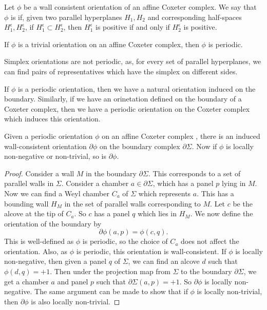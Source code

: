 \documentclass[11pt]{article}
\begin{document}
\begin{definition}
    Let $\phi$ be a wall consistent orientation of an affine Coxeter complex. We say that $\phi$ is  if, given two parallel hyperplanes $H_1,H_2$ and corresponding half-spaces $H_1^{\epsilon},H_2^{\epsilon}$, if $H_1^{\epsilon}\subset H_2^{\epsilon}$, then $H_1^{\epsilon}$ is positive if and only if $H_2^{\epsilon}$ is positive. 
\end{definition}

\begin{example}
    If $\phi$ is a trivial orientation on an affine Coxeter complex, then $\phi$ is periodic. 
\end{example}

\begin{example}
    Simplex orientations are not periodic, as, for every set of parallel hyperplanes, we can find pairs of representatives which have the simplex on different sides.
\end{example}

If $\phi$ is a periodic orientation, then we have a natural orientation induced on the boundary. Similarly, if we have an orinetation defined on the boundary of a Coxeter complex, then we have a periodic orientation on the Coxeter complex which induces this orientation. 

\begin{lemma}\cite[p.125]{SHA}
    Given a periodic orientation $\phi$ on an affine Coxeter complex \sg, there is an induced wall-consistent orientation $\partial\phi$ on the boundary complex $\partial\Sigma$. Now if $\phi$ is locally non-negative or non-trivial, so is $\partial\phi$. 
\end{lemma}

\begin{proof}
    Consider a wall $M$ in the boundary $\partial\Sigma$. This corresponds to a set of parallel walls in $\Sigma$. Consider a chamber $a\in \partial\Sigma$, which has a panel $p$ lying in $M$. Now we can find a Weyl chamber $C_a$ of $\Sigma$ which represents $a$. This has a bounding wall $H_M$ in the set of parallel walls corresponding to $M$. Let $c$ be the alcove at the tip of $C_a$. So $c$ has a panel $q$ which lies in $H_M$. We now define the orientation of the boundary by 
    \[\partial \phi (a,p)= \phi (c,q).\]
    This is well-defined as $\phi$ is periodic, so the choice of $C_a$ does not affect the orientation. Also, as $\phi$ is periodic, this orientation is wall-consistent. 
    If $\phi$ is locally non-negative, then given a panel $q$ of $\Sigma$, we can find an alcove $d$ such that $\phi(d,q)=+1$. Then under the projection map from $\Sigma$ to the boundary $\partial\Sigma$, we get a chamber $a$ and panel $p$ such that $\partial\Sigma(a,p)=+1$. So $\partial\phi$ is locally non-negative. The same argument can be made to show that if $\phi$ is locally non-trivial, then $\partial\phi$ is also locally non-trivial. 
\end{proof}
\end{document}
